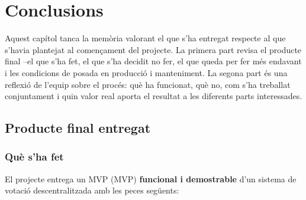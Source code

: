 
\chapter{Conclusions}
\label{cap:conclusions}

Aquest capítol tanca la memòria valorant el que s'ha entregat respecte
al que s'havia plantejat al començament del projecte. La primera part
revisa el producte final --el que s'ha fet, el que s'ha decidit no fer,
el que queda per fer més endavant i les condicions de posada en
producció i manteniment. La segona part és una reflexió de l'equip
sobre el procés: què ha funcionat, què no, com s'ha treballat
conjuntament i quin valor real aporta el resultat a les diferents
parts interessades.

\section{Producte final entregat}
\label{sec:producte-final}

\subsection{Què s'ha fet}

El projecte entrega un \acl{MVP} (\ac{MVP}) \textbf{funcional i
demostrable} d'un sistema de votació descentralitzada amb les peces
següents:


